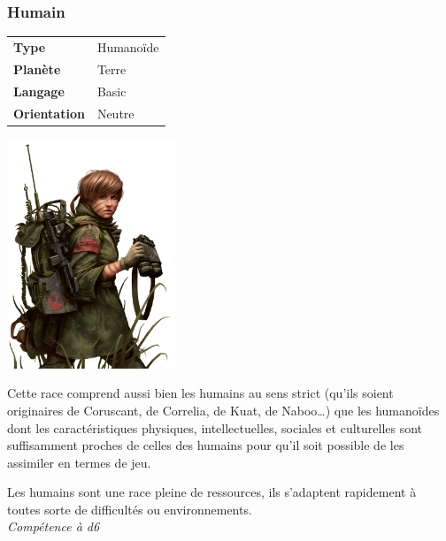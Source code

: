\subsubsection{Humain}
\begin{samepage}
	\begin{flushright}
		\begin{tabular}{ l l }
			\textbf{Type} 			& Humanoïde \\
		   	\textbf{Planète} 		& Terre \\
		   	\textbf{Langage} 		& Basic \\
		   	\textbf{Orientation} 	& Neutre \\
		\end{tabular}
	\end{flushright}

	\vspace{-6\baselineskip}
	\includegraphics[width=5cm]{img/personnages/races/humain.png} 
\end{samepage}

Cette race comprend aussi bien les humains au sens strict (qu’ils soient originaires de Coruscant, de Correlia, de Kuat, de Naboo\ldots) que les humanoïdes dont les caractéristiques physiques, intellectuelles, sociales et culturelles sont suffisamment proches de celles des humains pour qu’il soit possible de les assimiler en termes de jeu.

\begin{description}[align=left]
\item [Adaptabilité] 	%
	Les humains sont une race pleine de ressources, ils s’adaptent rapidement à toutes sorte de difficultés ou environnements.\\
	\emph{Compétence à d6}
\end{description}